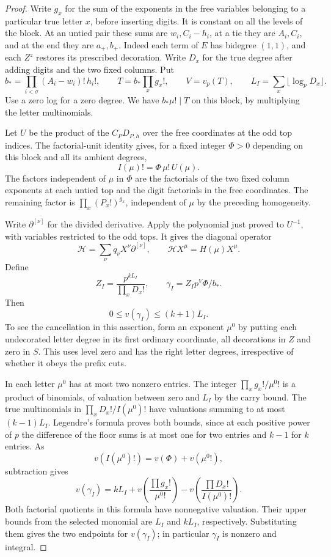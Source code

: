 \begin{proof}
Write \(g_x\) for the sum of the exponents in the free
variables belonging to a particular true letter \(x\), before
inserting digits. It is constant on all the levels of the
block. At an untied pair these sums are \(w_i,C_i-h_i\), at a
tie they are \(A_i,C_i\), and at the end they are \(a_+,b_+\).
Indeed each term of \(E\) has bidegree \((1,1)\), and each
\(Z^z\) restores its prescribed decoration. Write \(D_x\) for
the true degree after adding digits and the two fixed columns.
Put
\[
 b_*=\prod_{i<\sigma}(A_i-w_i)!\,h_i!,\qquad
 T=b_*\prod_x g_x!,\qquad V=v_p(T),\qquad
 L_I=\sum_x\lfloor\log_p D_x\rfloor .
\]
Use a zero log for a zero degree. We have \(b_*\mu!\mid T\)
on this block, by multiplying the letter multinomials.

Let \(U\) be the product of the \(C_PD_{P,h}\) over the free
coordinates at the odd top indices.
The factorial-unit identity gives, for a fixed integer
\(\Phi>0\) depending on this block and all its ambient degrees,
\[
 I(\mu)!=\Phi\,\mu!\,U(\mu).
\]
The factors independent of \(\mu\)
in \(\Phi\) are the factorials of the two fixed column
exponents at each untied top and the digit factorials in the
free coordinates. The remaining factor is
\(\prod_x(P_x!)^{g_x}\), independent of \(\mu\) by the preceding
homogeneity.

Write \(\partial^{[\nu]}\) for the divided derivative.
Apply the polynomial just proved to \(U^{-1}\),
with variables restricted to the odd tops. It gives the
diagonal operator
\[
 \mathcal H=\sum_\nu q_\nu X^\nu\partial^{[\nu]},
 \qquad \mathcal H X^\mu=H(\mu)X^\mu .
\]
Define
\begin{equation}\label{eq:digit-block-scale}
 Z_I=\frac{p^{kL_I}}{\prod_x D_x!},\qquad
 \gamma_I=Z_I p^V\Phi/b_* .
\end{equation}
Then
\[
 0\le v(\gamma_I)\le(k+1)L_I.
\]
To see the
cancellation in this assertion, form an exponent \(\mu^0\)
by putting each undecorated letter degree in its first ordinary
coordinate, all decorations in \(Z\) and zero in \(S\).
This uses level zero and has the right letter degrees,
irrespective of whether it obeys the prefix cuts.

In each
letter \(\mu^0\) has at most two nonzero entries. The
integer \(\prod_xg_x!/\mu^0!\) is a product of binomials,
of valuation between zero and \(L_I\) by the carry bound.
The true multinomials in \(\prod_xD_x!/I(\mu^0)!\) have
valuations summing to at most \((k-1)L_I\).
Legendre's formula proves both bounds, since at each positive
power of \(p\) the difference of the floor sums is at most one
for two entries and \(k-1\) for \(k\) entries. As
\[
 v(I(\mu^0)!)=v(\Phi)+v(\mu^0!),
\]
subtraction gives
\[
 v(\gamma_I)=kL_I+
 v\!\left(\frac{\prod g_x!}{\mu^0!}\right)
 -v\!\left(\frac{\prod D_x!}{I(\mu^0)!}\right).
\]
Both factorial quotients in this formula have nonnegative
valuation. Their upper bounds from the selected monomial
are \(L_I\) and \(kL_I\), respectively. Substituting them
gives the two endpoints for \(v(\gamma_I)\); in particular
\(\gamma_I\) is nonzero and integral.

\end{proof}

